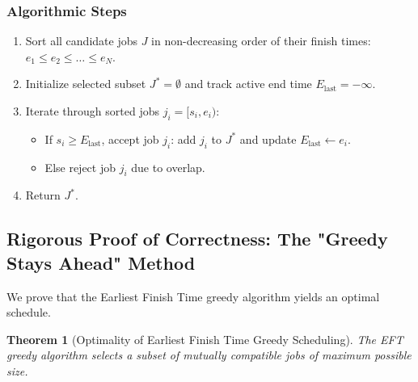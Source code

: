 \documentclass[10pt,journal,compsoc,onecolumn]{IEEEtran}
\newtheorem{theorem}{Theorem}
\begin{document}
\subsubsection{Algorithmic Steps}
\begin{enumerate}
    \item Sort all candidate jobs $J$ in non-decreasing order of their finish times: $e_1 \le e_2 \le \dots \le e_N$.
    \item Initialize selected subset $J^* = \emptyset$ and track active end time $E_{\text{last}} = -\infty$.
    \item Iterate through sorted jobs $j_i = [s_i, e_i)$:
    \begin{itemize}
        \item If $s_i \ge E_{\text{last}}$, accept job $j_i$: add $j_i$ to $J^*$ and update $E_{\text{last}} \leftarrow e_i$.
        \item Else reject job $j_i$ due to overlap.
    \end{itemize}
    \item Return $J^*$.
\end{enumerate}

\subsection{Rigorous Proof of Correctness: The "Greedy Stays Ahead" Method}

We prove that the Earliest Finish Time greedy algorithm yields an optimal schedule.

\begin{theorem}[Optimality of Earliest Finish Time Greedy Scheduling]
The EFT greedy algorithm selects a subset of mutually compatible jobs of maximum possible size.
\end{theorem}
\end{document}
